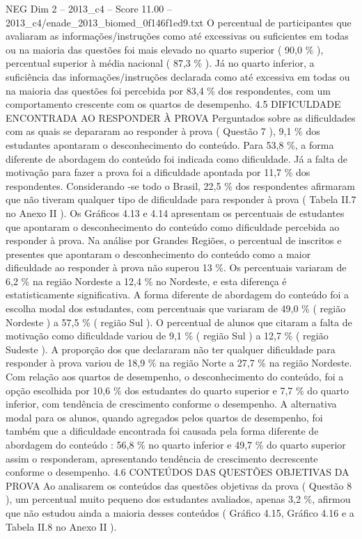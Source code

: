 \begin{textsample}{NEG Dim 2 – 2013\_c4 – Score 11.00 – 2013\_c4/enade\_2013\_biomed\_0f146f1ed9.txt}
O percentual de participantes que avaliaram as informações/instruções como até excessivas ou suficientes em todas ou na maioria das questões foi mais elevado no quarto superior ( 90,0 \% ), percentual superior à média nacional ( 87,3 \% ).
Já no quarto inferior, a suficiência das informações/instruções declarada como até excessiva em todas ou na maioria das questões foi percebida por 83,4 \% dos respondentes, com um comportamento crescente com os quartos de desempenho. 4.5 DIFICULDADE ENCONTRADA AO RESPONDER À PROVA Perguntados sobre as dificuldades com as quais se depararam ao responder à prova ( Questão 7 ), 9,1 \% dos estudantes apontaram o desconhecimento do conteúdo.
Para 53,8 \%, a forma diferente de abordagem do conteúdo foi indicada como dificuldade.
Já a falta de motivação para fazer a prova foi a dificuldade apontada por 11,7 \% dos respondentes.
Considerando -se todo o Brasil, 22,5 \% dos respondentes afirmaram que não tiveram qualquer tipo de dificuldade para responder à prova ( Tabela II.7 no Anexo II ).
Os Gráficos 4.13 e 4.14 apresentam os percentuais de estudantes que apontaram o desconhecimento do conteúdo como dificuldade percebida ao responder à prova.
Na análise por Grandes Regiões, o percentual de inscritos e presentes que apontaram o desconhecimento do conteúdo como a maior dificuldade ao responder à prova não superou 13 \%.
Os percentuais variaram de 6,2 \% na região Nordeste a 12,4 \% no Nordeste, e esta diferença é estatisticamente significativa.
A forma diferente de abordagem do conteúdo foi a escolha modal dos estudantes, com percentuais que variaram de 49,0 \% ( região Nordeste ) a 57,5 \% ( região Sul ).
O percentual de alunos que citaram a falta de motivação como dificuldade variou de 9,1 \% ( região Sul ) a 12,7 \% ( região Sudeste ).
A proporção dos que declararam não ter qualquer dificuldade para responder à prova variou de 18,9 \% na região Norte a 27,7 \% na região Nordeste.
Com relação aos quartos de desempenho, o desconhecimento do conteúdo, foi a opção escolhida por 10,6 \% dos estudantes do quarto superior e 7,7 \% do quarto inferior, com tendência de crescimento conforme o desempenho.
A alternativa modal para os alunos, quando agregados pelos quartos de desempenho, foi também que a dificuldade encontrada foi causada pela forma diferente de abordagem do conteúdo : 56,8 \% no quarto inferior e 49,7 \% do quarto superior assim o responderam, apresentando tendência de crescimento decrescente conforme o desempenho. 4.6 CONTEÚDOS DAS QUESTÕES OBJETIVAS DA PROVA Ao analisarem os conteúdos das questões objetivas da prova ( Questão 8 ), um percentual muito pequeno dos estudantes avaliados, apenas 3,2 \%, afirmou que não estudou ainda a maioria desses conteúdos ( Gráfico 4.15, Gráfico 4.16 e a Tabela II.8 no Anexo II ).

\end{textsample}
